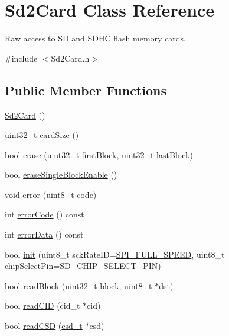 \hypertarget{class_sd2_card}{\section{Sd2\-Card Class Reference}
\label{class_sd2_card}
}


Raw access to S\-D and S\-D\-H\-C flash memory cards.  




{\ttfamily \#include $<$Sd2\-Card.\-h$>$}

\subsection*{Public Member Functions}
\begin{DoxyCompactItemize}
\item 
\hyperlink{class_sd2_card_a1f49fb22b3890260d2b8672010b17f49}{Sd2\-Card} ()
\item 
uint32\-\_\-t \hyperlink{class_sd2_card_a5ee7bcd3bda0173fa477efa86eaeab1a}{card\-Size} ()
\item 
bool \hyperlink{class_sd2_card_a9d1aea769c0e71a39d5bcd1c5d8ce446}{erase} (uint32\-\_\-t first\-Block, uint32\-\_\-t last\-Block)
\item 
bool \hyperlink{class_sd2_card_ae780c9bffb14b9fbf7077d97fb810976}{erase\-Single\-Block\-Enable} ()
\item 
void \hyperlink{class_sd2_card_aeca83c66edec1c068e687051abe76635}{error} (uint8\-\_\-t code)
\item 
int \hyperlink{class_sd2_card_ad8be6f07f86730f2b2fed4bb34b10f33}{error\-Code} () const 
\item 
int \hyperlink{class_sd2_card_a6f85fee8f55dfe119a47647cd4dfbcb9}{error\-Data} () const 
\item 
bool \hyperlink{class_sd2_card_a008934b78ad099ce978883287b320b47}{init} (uint8\-\_\-t sck\-Rate\-I\-D=\hyperlink{_sd2_card_8h_a6c091c07d1eb82a94b1c5738f720264b}{S\-P\-I\-\_\-\-F\-U\-L\-L\-\_\-\-S\-P\-E\-E\-D}, uint8\-\_\-t chip\-Select\-Pin=\hyperlink{_sd2_card_8h_ae6b17538c14ba6c91ccb513db2c4c29c}{S\-D\-\_\-\-C\-H\-I\-P\-\_\-\-S\-E\-L\-E\-C\-T\-\_\-\-P\-I\-N})
\item 
bool \hyperlink{class_sd2_card_a2d3c126910c2c0c9d6ac468a459eec39}{read\-Block} (uint32\-\_\-t block, uint8\-\_\-t $\ast$dst)
\item 
bool \hyperlink{class_sd2_card_ac2a262a5e6c508ec5d5b312f01b54e67}{read\-C\-I\-D} (cid\-\_\-t $\ast$cid)
\item 
bool \hyperlink{class_sd2_card_a4a73b4acf0416c0edd9ced858ad37656}{read\-C\-S\-D} (\hyperlink{unioncsd__t}{csd\-\_\-t} $\ast$csd)

\end{DoxyCompactItemize}
